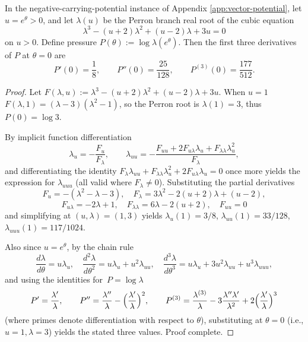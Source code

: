 \begin{conclusion}\label{con:xi-terminal-phi-minus-pressure-loworder-cumulants}
In the negative-carrying-potential instance of Appendix \ref{app:vector-potential}, let \(u=e^{\theta}>0\), and let \(\lambda(u)\) be the Perron branch real root of the cubic equation
\[
\lambda^{3}-(u+2)\lambda^{2}+(u-2)\lambda+3u=0
\]
on \(u>0\).
Define pressure
\(
P(\theta):=\log\lambda(e^{\theta})
\).
Then the first three derivatives of \(P\) at \(\theta=0\) are
\[
P'(0)=\frac18,\qquad
P''(0)=\frac{25}{128},\qquad
P^{(3)}(0)=\frac{177}{512}.
\]
\end{conclusion}
\begin{proof}[Proof]
Let \(F(\lambda,u):=\lambda^{3}-(u+2)\lambda^{2}+(u-2)\lambda+3u\).
When \(u=1\)
\(
F(\lambda,1)=(\lambda-3)(\lambda^{2}-1)
\), so the Perron root is \(\lambda(1)=3\), thus \(P(0)=\log 3\).
\par
By implicit function differentiation
\[
\lambda_u=-\frac{F_u}{F_\lambda},
\qquad
\lambda_{uu}=-\frac{F_{uu}+2F_{u\lambda}\lambda_u+F_{\lambda\lambda}\lambda_u^{2}}{F_\lambda},
\]
and differentiating the identity
\(
F_\lambda\lambda_{uu}+F_{\lambda\lambda}\lambda_u^{2}+2F_{u\lambda}\lambda_u=0
\)
once more yields the expression for \(\lambda_{uuu}\) (all valid where \(F_\lambda\neq 0\)).
Substituting the partial derivatives
\[
F_u=-(\lambda^{2}-\lambda-3),\quad
F_\lambda=3\lambda^{2}-2(u+2)\lambda+(u-2),
\]
\[
F_{u\lambda}=-2\lambda+1,\quad
F_{\lambda\lambda}=6\lambda-2(u+2),\quad
F_{uu}=0
\]
and simplifying at \((u,\lambda)=(1,3)\) yields
\(
\lambda_u(1)=3/8
\),
\(
\lambda_{uu}(1)=33/128
\),
\(
\lambda_{uuu}(1)=117/1024
\).
\par
Also since \(u=e^{\theta}\), by the chain rule
\[
\frac{d\lambda}{d\theta}=u\lambda_u,\quad
\frac{d^{2}\lambda}{d\theta^{2}}=u\lambda_u+u^{2}\lambda_{uu},\quad
\frac{d^{3}\lambda}{d\theta^{3}}=u\lambda_u+3u^{2}\lambda_{uu}+u^{3}\lambda_{uuu},
\]
and using the identities for \(\,P=\log\lambda\)
\[
P'=\frac{\lambda'}{\lambda},\qquad
P''=\frac{\lambda''}{\lambda}-\Bigl(\frac{\lambda'}{\lambda}\Bigr)^{2},\qquad
P^{(3)}=\frac{\lambda^{(3)}}{\lambda}-3\frac{\lambda''\lambda'}{\lambda^{2}}+2\Bigl(\frac{\lambda'}{\lambda}\Bigr)^{3}
\]
(where primes denote differentiation with respect to \(\theta\)), substituting at \(\theta=0\) (i.e., \(u=1,\lambda=3\)) yields the stated three values. Proof complete.
\end{proof}

